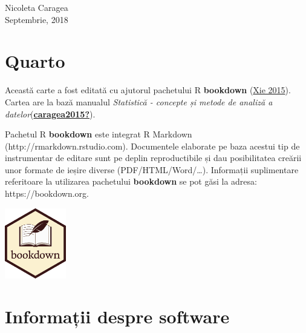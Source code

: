 \documentclass[
  11pt,
  b5paper,
  nottoc]{book}
\begin{document}
\begin{flushright}
Nicoleta Caragea \\
Septembrie, 2018
\end{flushright}

\newpage

\hypertarget{quarto}{%
\section*{Quarto}\label{quarto}}


Această carte a fost editată cu ajutorul pachetului R \textbf{bookdown}
(\protect\hyperlink{ref-xie2015}{Xie 2015}).\\
Cartea are la bază manualul \emph{Statistică - concepte și metode de
analiză a
datelor}(\protect\hyperlink{ref-caragea2015}{\textbf{caragea2015?}}).

Pachetul R \textbf{bookdown} este integrat R Markdown
(http://rmarkdown.rstudio.com). Documentele elaborate pe baza acestui
tip de instrumentar de editare sunt pe deplin reproductibile și dau
posibilitatea creării unor formate de ieșire diverse
(PDF/HTML/Word/\ldots). Informații suplimentare referitoare la
utilizarea pachetului \textbf{bookdown} se pot găsi la adresa:
https://bookdown.org.

\includegraphics[width=0.2\textwidth]{images/logo.png}

\hypertarget{informaux21bii-despre-software}{%
\section*{Informații despre
software}\label{informaux21bii-despre-software}}

\end{document}

